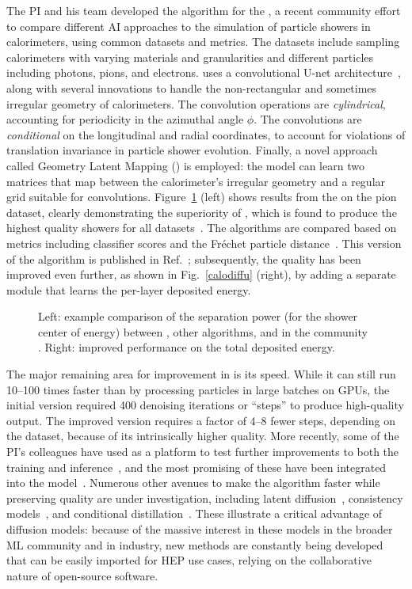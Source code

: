 The PI and his team developed the \diffu algorithm for the \challenge,
a recent community effort to compare different AI approaches to the simulation of particle showers in calorimeters, using common datasets and metrics.
The datasets include sampling calorimeters with varying materials and granularities and different particles including photons, pions, and electrons.
\diffu uses a convolutional U-net architecture~\cite{}, along with several innovations to handle the non-rectangular and sometimes irregular geometry of calorimeters.
The convolution operations are \textit{cylindrical}, accounting for periodicity in the azimuthal angle $\phi$.
The convolutions are \textit{conditional} on the longitudinal and radial coordinates, to account for violations of translation invariance in particle shower evolution.
Finally, a novel approach called Geometry Latent Mapping (\glam) is employed:
the model can learn two matrices that map between the calorimeter's irregular geometry and a regular grid suitable for convolutions.
Figure~\ref{fig:calodiffu} (left) shows results from the \challenge on the pion dataset, clearly demonstrating the superiority of \diffu,
which is found to produce the highest quality showers for all datasets~\cite{}.
The algorithms are compared based on metrics including classifier scores and the Fr\'echet particle distance~\cite{}.
This version of the algorithm is published in Ref.~\cite{};
subsequently, the quality has been improved even further, as shown in Fig.~\ref{calodiffu} (right), by adding a separate module that learns the per-layer deposited energy.

\begin{figure}[htb!]
\centering
{}
\caption{Left: example comparison of the separation power (for the shower center of energy) between \diffu, other algorithms, and \GEANTfour in the community \challenge.
Right: improved \diffu performance on the total deposited energy.}
\label{fig:calodiffu}
\end{figure}

The major remaining area for improvement in \diffu is its speed.
While it can still run 10--100 times faster than \GEANTfour by processing particles in large batches on GPUs,
the initial version required 400 denoising iterations or ``steps'' to produce high-quality output.
The improved version requires a factor of 4--8 fewer steps, depending on the dataset, because of its intrinsically higher quality.
More recently, some of the PI's colleagues have used \diffu as a platform to test further improvements to both the training and inference~\cite{},
and the most promising of these have been integrated into the model~\cite{}.
Numerous other avenues to make the algorithm faster while preserving quality are under investigation,
including latent diffusion~\cite{}, consistency models~\cite{}, and conditional distillation~\cite{}.
These illustrate a critical advantage of diffusion models:
because of the massive interest in these models in the broader ML community and in industry,
new methods are constantly being developed that can be easily imported for HEP use cases,
relying on the collaborative nature of open-source software.

